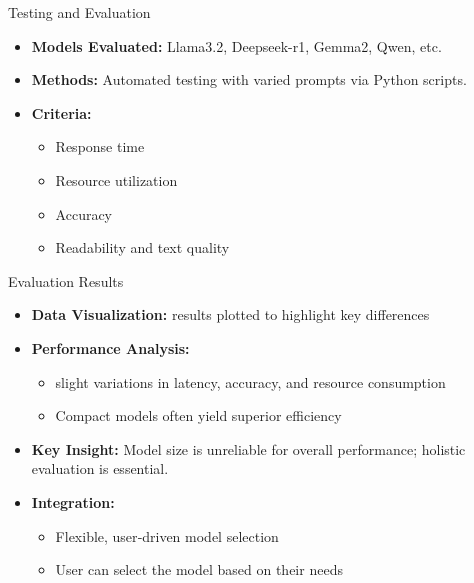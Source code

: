 \documentclass{beamer}
\begin{document}
\begin{frame}{Testing and Evaluation}
  \begin{itemize}
    \item \textbf{Models Evaluated:} Llama3.2, Deepseek-r1, Gemma2, Qwen, etc.
    \item \textbf{Methods:} Automated testing with varied prompts via Python scripts.
    \item \textbf{Criteria:}
      \begin{itemize}
        \item Response time
        \item Resource utilization
        \item Accuracy
        \item Readability and text quality
      \end{itemize}
  \end{itemize}
\end{frame}

\begin{frame}{Evaluation Results}
        \begin{itemize}
        \item \textbf{Data Visualization:} results plotted to highlight key differences
        \item \textbf{Performance Analysis:}
          \begin{itemize}
            \item slight variations in latency, accuracy, and resource consumption
            \item Compact models often yield superior efficiency
          \end{itemize}
          \item \textbf{Key Insight:} Model size is unreliable for overall performance; holistic evaluation is essential.
        \item \textbf{Integration:}
          \begin{itemize}
            \item Flexible, user‑driven model selection
            \item User can select the model based on their needs
          \end{itemize}
      \end{itemize}
\end{frame}
\end{document}
